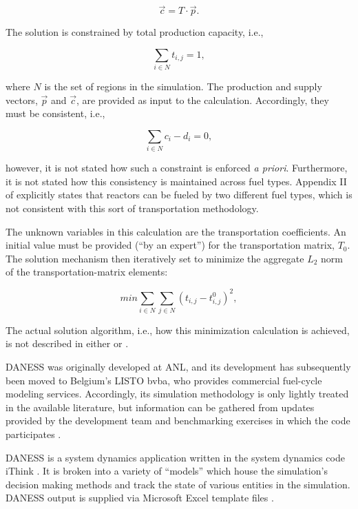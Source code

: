 \begin{equation*}
\vec{c} = T \cdot \vec{p}.
\end{equation*}

The solution is constrained by total production capacity, i.e., 

\begin{equation*}
\sum_{i \in N} t_{i,j} = 1,
\end{equation*}

where $N$ is the set of regions in the simulation. The production and supply
vectors, $\vec{p}$ and $\vec{c}$, are provided as input to the
calculation. Accordingly, they must be consistent, i.e.,

\begin{equation*}
\sum_{i \in N} c_i - d_i = 0,
\end{equation*}

however, it is not stated how such a constraint is enforced \textit{a
  priori}. Furthermore, it is not stated how this consistency is maintained
across fuel types. Appendix II of \cite{_international_2009} explicitly states
that reactors can be fueled by two different fuel types, which is not consistent
with this sort of transportation methodology. 

The unknown variables in this calculation are the transportation
coefficients. An initial value must be provided (``by an expert'') for the
transportation matrix, $T_0$. The solution mechanism then iteratively set to
minimize the aggregate $L_2$ norm of the transportation-matrix elements:

\begin{equation*}
min \sum_{i \in N} \sum_{j \in N} \left( t_{i,j} - t_{i,j}^0 \right)^2,
\end{equation*}

The actual solution algorithm, i.e., how this minimization calculation is
achieved, is not described in either \cite{iaea_nuclear_2010} or
\cite{andrianova_desae_2008}.

DANESS was originally developed at ANL, and its development has subsequently
been moved to Belgium's LISTO bvba, who provides commercial fuel-cycle modeling
services. Accordingly, its simulation methodology is only lightly treated in the
available literature, but information can be gathered from updates provided by
the development team \cite{durpel_daness_2003,van_den_durpel_daness_2009} and
benchmarking exercises in which the code participates
\cite{guerin_benchmark_2009}.

DANESS is a system dynamics application written in the system dynamics code
iThink \cite{richmond_ithink_2004}. It is broken into a variety of ``models''
which house the simulation's decision making methods and track the state of
various entities in the simulation. DANESS output is supplied via Microsoft
Excel template files \cite{guerin_benchmark_2009}.

